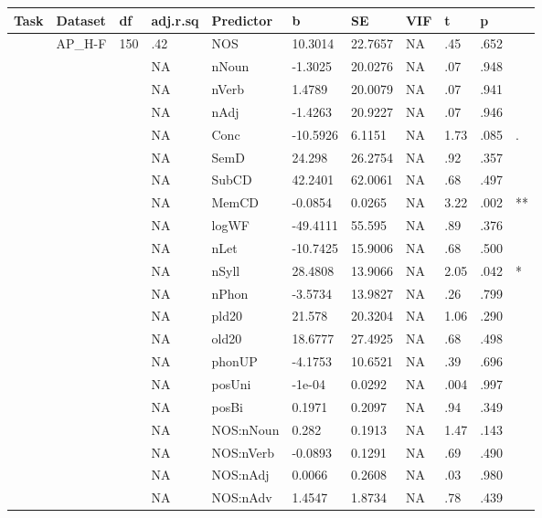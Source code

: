 \begin{table}[ht]
\centering
\begingroup\normalsize
\begin{tabular}{lllllllllll}
  \hline
Task & Dataset & df & adj.r.sq & Predictor & b & SE & VIF & t & p &  \\ 
  \hline
 & AP\_H-F & 150 & .42 & NOS & 10.3014 & 22.7657 & NA & .45 & .652 &   \\ 
   &  &  & NA & nNoun & -1.3025 & 20.0276 & NA & .07 & .948 &   \\ 
   &  &  & NA & nVerb & 1.4789 & 20.0079 & NA & .07 & .941 &   \\ 
   &  &  & NA & nAdj & -1.4263 & 20.9227 & NA & .07 & .946 &   \\ 
   &  &  & NA & Conc & -10.5926 & 6.1151 & NA & 1.73 & .085 & . \\ 
   &  &  & NA & SemD & 24.298 & 26.2754 & NA & .92 & .357 &   \\ 
   &  &  & NA & SubCD & 42.2401 & 62.0061 & NA & .68 & .497 &   \\ 
   &  &  & NA & MemCD & -0.0854 & 0.0265 & NA & 3.22 & .002 & ** \\ 
   &  &  & NA & logWF & -49.4111 & 55.595 & NA & .89 & .376 &   \\ 
   &  &  & NA & nLet & -10.7425 & 15.9006 & NA & .68 & .500 &   \\ 
   &  &  & NA & nSyll & 28.4808 & 13.9066 & NA & 2.05 & .042 & * \\ 
   &  &  & NA & nPhon & -3.5734 & 13.9827 & NA & .26 & .799 &   \\ 
   &  &  & NA & pld20 & 21.578 & 20.3204 & NA & 1.06 & .290 &   \\ 
   &  &  & NA & old20 & 18.6777 & 27.4925 & NA & .68 & .498 &   \\ 
   &  &  & NA & phonUP & -4.1753 & 10.6521 & NA & .39 & .696 &   \\ 
   &  &  & NA & posUni & -1e-04 & 0.0292 & NA & .004 & .997 &   \\ 
   &  &  & NA & posBi & 0.1971 & 0.2097 & NA & .94 & .349 &   \\ 
   &  &  & NA & NOS:nNoun & 0.282 & 0.1913 & NA & 1.47 & .143 &   \\ 
   &  &  & NA & NOS:nVerb & -0.0893 & 0.1291 & NA & .69 & .490 &   \\ 
   &  &  & NA & NOS:nAdj & 0.0066 & 0.2608 & NA & .03 & .980 &   \\ 
   &  &  & NA & NOS:nAdv & 1.4547 & 1.8734 & NA & .78 & .439 &   \\ 

\end{tabular}
\end{table}
